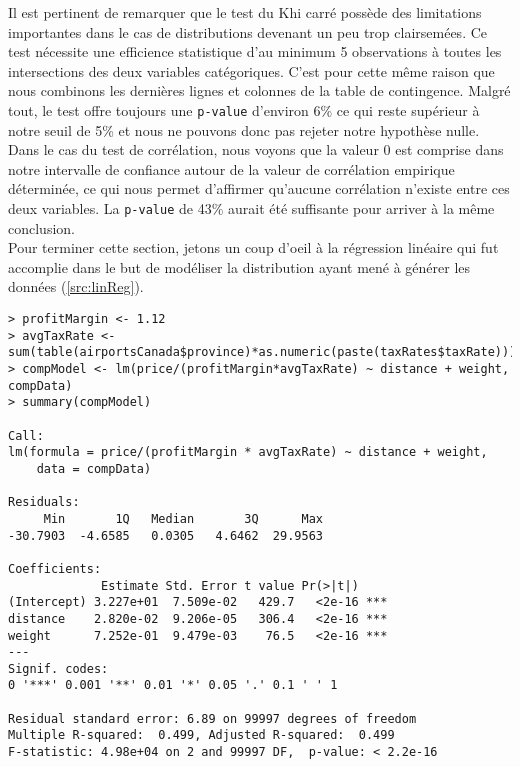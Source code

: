 \vspace{\baselineskip}
Il est pertinent de remarquer que le test du Khi carré possède des limitations importantes dans le cas de distributions devenant un peu trop clairsemées. Ce test nécessite une efficience statistique d'au minimum 5 observations à toutes les intersections des deux variables catégoriques. C'est pour cette même raison que nous combinons les dernières lignes et colonnes de la table de contingence. Malgré tout, le test offre toujours une \texttt{p-value} d'environ 6\% ce qui reste supérieur à notre seuil de 5\% et nous ne pouvons donc pas rejeter notre hypothèse nulle. Dans le cas du test de corrélation, nous voyons que la valeur 0 est comprise dans notre intervalle de confiance autour de la valeur de corrélation empirique déterminée, ce qui nous permet d'affirmer qu'aucune corrélation n'existe entre ces deux variables. La \texttt{p-value} de 43\% aurait été suffisante pour arriver à la même conclusion. \\

Pour terminer cette section, jetons un coup d'oeil à la régression linéaire qui fut accomplie dans le but de modéliser la distribution ayant mené à générer les données (\autoref{src:linReg}).

\begin{lstlisting}[caption = Régression linéaire sur données empiriques,label=src:linReg]
> profitMargin <- 1.12
> avgTaxRate <- sum(table(airportsCanada$province)*as.numeric(paste(taxRates$taxRate)))/length(airportsCanada$province)
> compModel <- lm(price/(profitMargin*avgTaxRate) ~ distance + weight, compData)
> summary(compModel)

Call:
lm(formula = price/(profitMargin * avgTaxRate) ~ distance + weight, 
    data = compData)

Residuals:
     Min       1Q   Median       3Q      Max 
-30.7903  -4.6585   0.0305   4.6462  29.9563 

Coefficients:
             Estimate Std. Error t value Pr(>|t|)    
(Intercept) 3.227e+01  7.509e-02   429.7   <2e-16 ***
distance    2.820e-02  9.206e-05   306.4   <2e-16 ***
weight      7.252e-01  9.479e-03    76.5   <2e-16 ***
---
Signif. codes:  
0 '***' 0.001 '**' 0.01 '*' 0.05 '.' 0.1 ' ' 1

Residual standard error: 6.89 on 99997 degrees of freedom
Multiple R-squared:  0.499,	Adjusted R-squared:  0.499 
F-statistic: 4.98e+04 on 2 and 99997 DF,  p-value: < 2.2e-16
\end{lstlisting}

